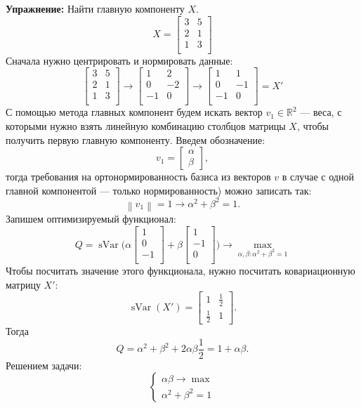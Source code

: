 \documentclass[12pt]{article} %
\theoremstyle{definition} %
\DeclareMathOperator{\sVar}{sVar}
\def \RR{\mathbb{R}}
\begin{document}
\textbf{Упражнение:} Найти главную компоненту \(X\).
\[
X =
\begin{bmatrix}
3 & 5\\
2 & 1\\
1 & 3\\
\end{bmatrix}
\]
Сначала нужно центрировать и нормировать данные:
\[
\begin{bmatrix}
3 & 5\\
2 & 1\\
1 & 3\\
\end{bmatrix}
\to
\begin{bmatrix}
1 & 2\\
0 & -2\\
-1 & 0\\
\end{bmatrix}
\to
\begin{bmatrix}
1 & 1\\
0 & -1\\
-1 & 0\\
\end{bmatrix}
=X'
\]
С помощью метода главных компонент будем искать вектор \(v_1 \in \RR^2\) —  веса, с которыми нужно взять линейную комбинацию столбцов матрицы \(X\), чтобы получить первую главную компоненту. Введем обозначение:
\[v_1
= \begin{bmatrix}
\alpha\\
\beta
\end{bmatrix},
\]
тогда требования на ортонормированность базиса из векторов \(v\) в случае с одной главной компонентой  — только нормированность) можно записать так:
\[ \left\| v_1 \right\| = 1 \to \alpha^2 + \beta^2 = 1. \]
Запишем оптимизируемый функционал:
\[
Q = \sVar \bigg(
\alpha \begin{bmatrix}
1\\
0\\
-1\\
\end{bmatrix}
+
\beta \begin{bmatrix}
1\\
-1\\
0\\
\end{bmatrix}
\bigg)
\to \max_{\alpha, \beta : \alpha^2+\beta^2=1}
\]
Чтобы посчитать значение этого функционала, нужно посчитать ковариационную матрицу \(X'\):
\[
\sVar(X')=
\begin{bmatrix}
1&\frac{1}{2}\\
\frac{1}{2}&1
\end{bmatrix}.
\]
Тогда
\[Q = \alpha^2 + \beta^2 + 2\alpha \beta \frac{1}{2} = 1+\alpha \beta.\]
Решением задачи:
\[
\begin{cases}
\alpha \beta \to \max \\
\alpha^2 + \beta^2 = 1
\end{cases}
\]
\end{document}
